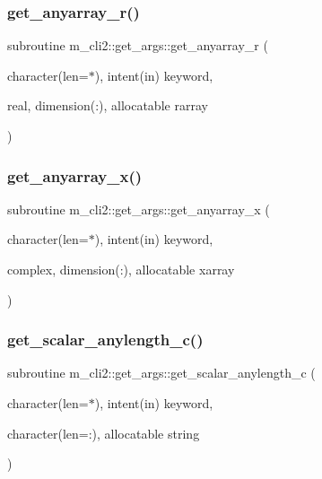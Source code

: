 \subsubsection{\texorpdfstring{get\+\_\+anyarray\+\_\+r()}{get\_anyarray\_r()}}
{\footnotesize\ttfamily subroutine m\+\_\+cli2\+::get\+\_\+args\+::get\+\_\+anyarray\+\_\+r (\begin{DoxyParamCaption}\item[{character(len=$\ast$), intent(in)}]{keyword,  }\item[{real, dimension(\+:), allocatable}]{rarray }\end{DoxyParamCaption})\hspace{0.3cm}{\ttfamily [private]}}

\mbox{\label{interfacem__cli2_1_1get__args_a66a3ba683da196f5f0d423345332c88c}} 
\subsubsection{\texorpdfstring{get\+\_\+anyarray\+\_\+x()}{get\_anyarray\_x()}}
{\footnotesize\ttfamily subroutine m\+\_\+cli2\+::get\+\_\+args\+::get\+\_\+anyarray\+\_\+x (\begin{DoxyParamCaption}\item[{character(len=$\ast$), intent(in)}]{keyword,  }\item[{complex, dimension(\+:), allocatable}]{xarray }\end{DoxyParamCaption})\hspace{0.3cm}{\ttfamily [private]}}

\mbox{\label{interfacem__cli2_1_1get__args_a42c3b7050881edf76682b7b0058b868a}} 
\subsubsection{\texorpdfstring{get\+\_\+scalar\+\_\+anylength\+\_\+c()}{get\_scalar\_anylength\_c()}}
{\footnotesize\ttfamily subroutine m\+\_\+cli2\+::get\+\_\+args\+::get\+\_\+scalar\+\_\+anylength\+\_\+c (\begin{DoxyParamCaption}\item[{character(len=$\ast$), intent(in)}]{keyword,  }\item[{character(len=\+:), allocatable}]{string }\end{DoxyParamCaption})\hspace{0.3cm}{\ttfamily [private]}}

